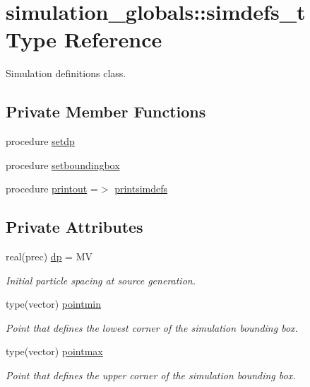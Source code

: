 \hypertarget{structsimulation__globals_1_1simdefs__t}{}\section{simulation\+\_\+globals\+:\+:simdefs\+\_\+t Type Reference}
\label{structsimulation__globals_1_1simdefs__t}


Simulation definitions class.  


\subsection*{Private Member Functions}
\begin{DoxyCompactItemize}
\item 
procedure \mbox{\hyperlink{structsimulation__globals_1_1simdefs__t_ac1951dc05be68a08a70d55b0da627f04}{setdp}}
\item 
procedure \mbox{\hyperlink{structsimulation__globals_1_1simdefs__t_aae43bf7d19c5cfceb113c35bc13cca8d}{setboundingbox}}
\item 
procedure \mbox{\hyperlink{structsimulation__globals_1_1simdefs__t_aade8e069ae929a97a9c78cc52d1078f7}{printout}} =$>$ \mbox{\hyperlink{namespacesimulation__globals_ad90d6959da1d43e2cd1febff82187ed5}{printsimdefs}}
\end{DoxyCompactItemize}
\subsection*{Private Attributes}
\begin{DoxyCompactItemize}
\item 
real(prec) \mbox{\hyperlink{structsimulation__globals_1_1simdefs__t_a416b838aca82edb2df262f5f503a00ae}{dp}} = MV
\begin{DoxyCompactList}\small\item\em Initial particle spacing at source generation. \end{DoxyCompactList}\item 
type(vector) \mbox{\hyperlink{structsimulation__globals_1_1simdefs__t_a76b66c4e9d305de6a0c3b8f1bd2ef319}{pointmin}}
\begin{DoxyCompactList}\small\item\em Point that defines the lowest corner of the simulation bounding box. \end{DoxyCompactList}\item 
type(vector) \mbox{\hyperlink{structsimulation__globals_1_1simdefs__t_a8c7a365078a69252312ea200c619bcb6}{pointmax}}
\begin{DoxyCompactList}\small\item\em Point that defines the upper corner of the simulation bounding box. \end{DoxyCompactList}\end{DoxyCompactItemize}


